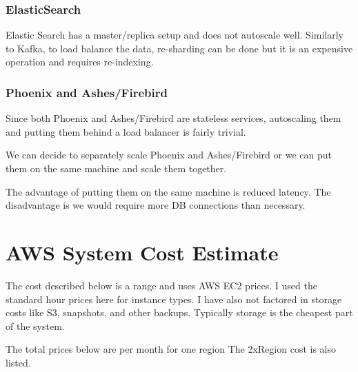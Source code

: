 \documentclass[11pt]{article}
\begin{document}
\subsubsection{ElasticSearch}

Elastic Search has a master/replica setup and does not autoscale well. Similarly
to Kafka, to load balance the data, re-sharding can be done but it is an 
expensive operation and requires re-indexing.

\subsubsection{Phoenix and Ashes/Firebird}

Since both Phoenix and Ashes/Firebird are stateless services, autoscaling them and putting
them behind a load balancer is fairly trivial.

We can decide to separately scale Phoenix and Ashes/Firebird or we can put them
on the same machine and scale them together. 

The advantage of putting them on the same machine is reduced latency. The disadvantage
is we would require more DB connections than necessary.

\section{AWS System Cost Estimate}

The cost described below is a range and uses AWS EC2 prices. I used the standard
hour prices here for instance types. I have also not factored in storage costs like S3,
snapshots, and other backups. Typically storage is the cheapest part of the system.

The total prices below are per month for one region The 2xRegion cost is also listed.
\end{document}
